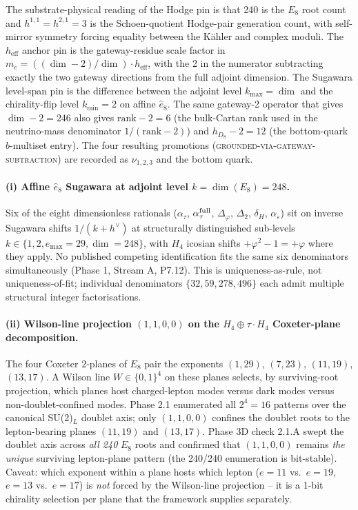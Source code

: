 ﻿\documentclass[reprint,amsmath,amssymb,aps,prd,longbibliography,floatfix]{revtex4-2}
\begin{document}
The substrate-physical reading of the Hodge pin is that 240 is the
$E_8$ root count and $h^{1,1} = h^{2,1} = 3$ is the Schoen-quotient
Hodge-pair generation count, with self-mirror symmetry forcing equality
between the K\"ahler and complex moduli. The $h_\mathrm{eff}$ anchor pin
is the gateway-residue scale factor in
$m_e = ((\dim - 2)/\dim) \cdot h_\mathrm{eff}$, with the 2 in the
numerator subtracting exactly the two gateway directions from the full
adjoint dimension. The Sugawara level-span pin is the difference
between the adjoint level $k_\mathrm{max} = \dim$ and the
chirality-flip level $k_\mathrm{min} = 2$ on affine $\widehat{e}_8$.
The same gateway-2 operator that gives $\dim - 2 = 246$ also gives
$\mathrm{rank} - 2 = 6$ (the bulk-Cartan rank used in the neutrino-mass
denominator $1/(\mathrm{rank} - 2)$) and $h_{D_8} - 2 = 12$ (the
bottom-quark $b$-multiset entry). The four resulting promotions
(\textsc{grounded-via-gateway-subtraction}) are recorded as
$\nu_{1,2,3}$ and the bottom quark.

\paragraph{(i) Affine $\widehat{e}_8$ Sugawara at adjoint level
$k = \dim(E_8) = 248$.} Six of the eight dimensionless rationals
($\alpha_\tau$, $\alpha_\tau^{\rm full}$, $\Delta_\varphi$, $\Delta_2$,
$\delta_H$, $\alpha_\varepsilon$) sit on inverse Sugawara shifts
$1/(k + h^\vee)$ at structurally distinguished sub-levels
$k \in \{1, 2, e_{\max} = 29, \dim = 248\}$, with $H_4$ icosian shifts
$+\varphi^2 - 1 = +\varphi$ where they apply. No published competing
identification fits the same six denominators simultaneously
(Phase 1, Stream A, P7.12). This is uniqueness-as-rule, not
uniqueness-of-fit; individual denominators
$\{32, 59, 278, 496\}$ each admit multiple structural integer
factorisations.

\paragraph{(ii) Wilson-line projection $(1, 1, 0, 0)$ on the
$H_4 \oplus \tau \cdot H_4$ Coxeter-plane decomposition.} The four
Coxeter $2$-planes of $E_8$ pair the exponents $(1, 29)$, $(7, 23)$,
$(11, 19)$, $(13, 17)$. A Wilson line $W \in \{0, 1\}^4$ on these
planes selects, by surviving-root projection, which planes host
charged-lepton modes versus dark modes versus
non-doublet-confined modes. Phase 2.1 enumerated all $2^4 = 16$ patterns
over the canonical SU(2)$_L$ doublet axis; only $(1, 1, 0, 0)$ confines
the doublet roots to the lepton-bearing planes $(11, 19)$ and
$(13, 17)$. Phase 3D check 2.1.A swept the doublet axis across
\emph{all 240} $E_8$ roots and confirmed that $(1, 1, 0, 0)$ remains
\emph{the unique} surviving lepton-plane pattern (the 240/240
enumeration is bit-stable). Caveat: which exponent within a plane
hosts which lepton ($e = 11$ vs.\ $e = 19$, $e = 13$ vs.\ $e = 17$) is
\emph{not} forced by the Wilson-line projection -- it is a 1-bit
chirality selection per plane that the framework supplies separately.
\end{document}
